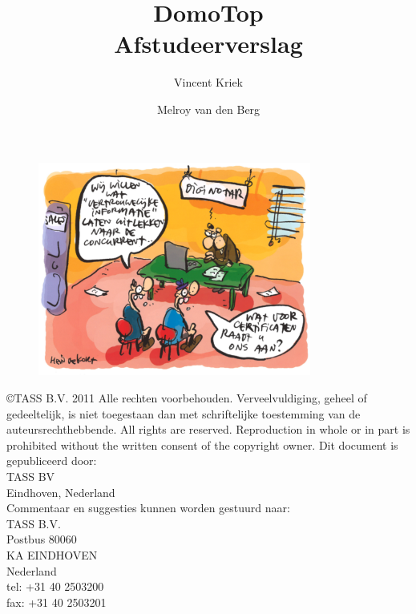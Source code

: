 \documentclass[]{article}
\begin{document}
\title{\textbf{DomoTop} \\Afstudeerverslag}
\author{Vincent Kriek \and Melroy van den Berg}

\maketitle

\thispagestyle{empty}
\begin{figure}[htpb]
   \begin{center}
    \includegraphics[width=0.8\textwidth]{voorkant.pdf}
   \end{center}
\end{figure}

\vspace*{\fill}

\newpage
\thispagestyle{empty}

\noindent\copyright  TASS B.V. 2011
Alle rechten voorbehouden. Verveelvuldiging, geheel of gedeeltelijk, is
niet toegestaan dan met schriftelijke toestemming van de
auteursrechthebbende.
All rights are reserved. Reproduction in whole or in part is prohibited
without the written consent of the copyright owner. Dit document is
gepubliceerd door:\\
TASS BV\\
Eindhoven, Nederland\\

\noindent Commentaar en suggesties kunnen worden gestuurd naar:\\
\indent TASS B.V.\\
\indent\indent Postbus 80060\\
\indent{} KA  EINDHOVEN\\
\indent\indent Nederland\\
\indent\indent tel:  +31 40 2503200\\
\indent\indent fax:  +31 40 2503201\\
\end{document}

